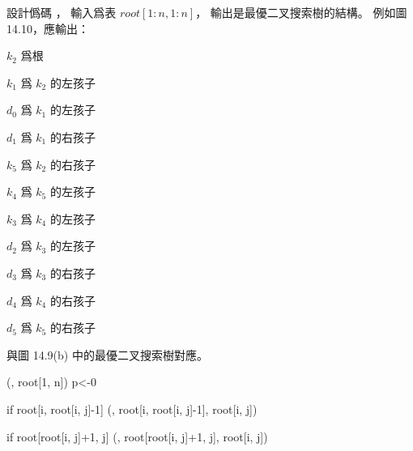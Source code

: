 \startEXERCISE
設計僞碼 ，
輸入爲表 $root[1:n,1:n]$，
輸出是最優二叉搜索樹的結構。
例如圖 14.10，應輸出：

$k_2$ 爲根

$k_1$ 爲 $k_2$ 的左孩子

$d_0$ 爲 $k_1$ 的左孩子

$d_1$ 爲 $k_1$ 的右孩子

$k_5$ 爲 $k_2$ 的右孩子

$k_4$ 爲 $k_5$ 的左孩子

$k_3$ 爲 $k_4$ 的左孩子

$d_2$ 爲 $k_3$ 的左孩子

$d_3$ 爲 $k_3$ 的右孩子

$d_4$ 爲 $k_4$ 的右孩子

$d_5$ 爲 $k_5$ 的右孩子

與圖 14.9(b) 中的最優二叉搜索樹對應。
\stopEXERCISE

\startANSWER
{}
\startCLRSCODE
{}(, root[1, n])
p<-0
\stopCLRSCODE

\startCLRSCODE
if root[i, root[i, j]-1]
	(, root[i, root[i, j]-1], root[i, j])

if root[root[i, j]+1, j]
	(, root[root[i, j]+1, j], root[i, j])
\stopCLRSCODE
\stopANSWER
